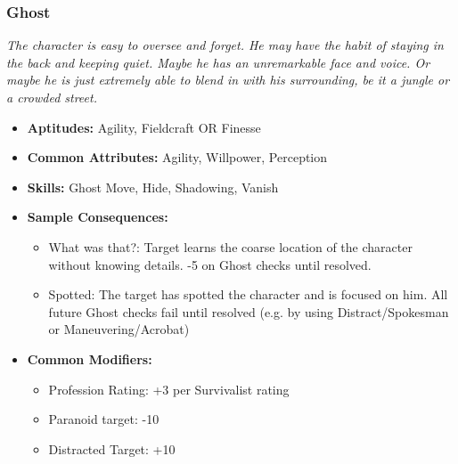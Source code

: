 \subsubsection{Ghost}\label{Ghost}
\textit{The character is easy to oversee and forget.
He may have the habit of staying in the back and keeping quiet.
Maybe he has an unremarkable face and voice.
Or maybe he is just extremely able to blend in with his surrounding, be it a jungle or a crowded street.}
\begin{itemize}
	\item \textbf{Aptitudes:} Agility, Fieldcraft OR Finesse
	\item \textbf{Common Attributes:} Agility, Willpower, Perception
	\item \textbf{Skills:} Ghost Move, Hide, Shadowing, Vanish
	\item \textbf{Sample Consequences:} 
	\begin{itemize}
		\item What was that?: Target learns the coarse location of the character without knowing details. -5 on Ghost checks until resolved.
		\item Spotted: The target has spotted the character and is focused on him. All future Ghost checks fail until resolved (e.g. by using Distract/Spokesman or Maneuvering/Acrobat)
	\end{itemize}
	\item \textbf{Common Modifiers:}
	\begin{itemize}
		\item Profession Rating: +3 per Survivalist rating
		\item Paranoid target: -10
		\item Distracted Target: +10
	\end{itemize}
\end{itemize}

